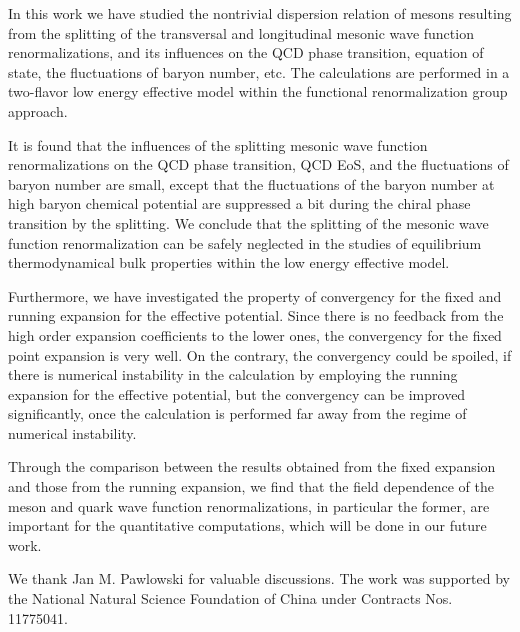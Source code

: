 \documentclass[%
reprint,
superscriptaddress,
showpacs,preprintnumbers,
 amsmath,amssymb,
 aps,
prd,
]{revtex4-1}
\begin{document}
In this work we have studied the nontrivial dispersion relation of mesons resulting from the splitting of the transversal and longitudinal mesonic wave function renormalizations, and its influences on the QCD phase transition, equation of state, the fluctuations of baryon number, etc. The calculations are performed in a two-flavor low energy effective model within the functional renormalization group approach. 

It is found that the influences of the splitting mesonic wave function renormalizations on the QCD phase transition, QCD EoS, and the fluctuations of baryon number are small, except that the fluctuations of the baryon number at high baryon chemical potential are suppressed a bit during the chiral phase transition by the splitting. We conclude that the splitting of the mesonic wave function renormalization can be safely neglected in the studies of equilibrium thermodynamical bulk properties within the low energy effective model.

Furthermore, we have investigated the property of convergency for the fixed and running expansion for the effective potential. Since there is no feedback from the high order expansion coefficients to the lower ones, the convergency for the fixed point expansion is very well. On the contrary, the convergency could be spoiled, if there is numerical instability in the calculation by employing the running expansion for the effective potential, but the convergency can be improved significantly, once the calculation is performed far away from the regime of numerical instability. 

Through the comparison between the results obtained from the fixed expansion and those from the running expansion, we find that the field dependence of the meson and quark wave function renormalizations, in particular the former, are important for the quantitative computations, which will be done in our future work.



\begin{acknowledgments}

We thank Jan M. Pawlowski for valuable discussions. The work was supported by the National Natural Science Foundation of China under Contracts Nos. 11775041.

\end{acknowledgments}


\end{document}
